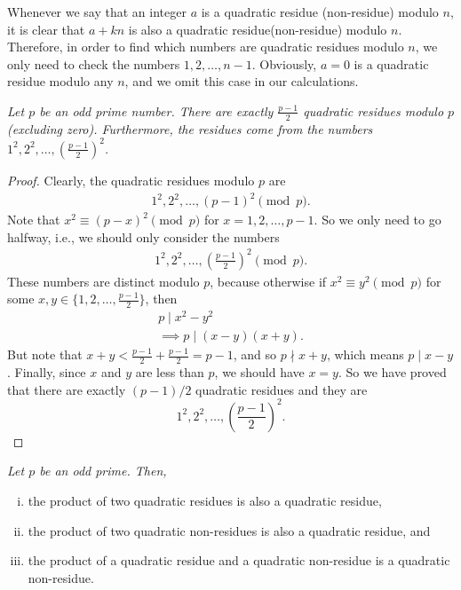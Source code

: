 \documentclass[main.tex]{subfile}
\begin{document}
	\begin{note}
		Whenever we say that an integer $a$ is a quadratic residue (non-residue) modulo $n$, it is clear that $a+kn$ is also a quadratic residue(non-residue) modulo $n$. Therefore, in order to find which numbers are quadratic residues modulo $n$, we only need to check the numbers $1, 2, \ldots, n-1$. Obviously, $a=0$ is a quadratic residue modulo any $n$, and we omit this case in our calculations.
	\end{note}

	\begin{theorem}\slshape\label{thm:primeresidue}
		Let $p$ be an odd prime number. There are exactly $\displaystyle \frac{p-1}{2}$ quadratic residues modulo $p$ (excluding zero). Furthermore, the residues come from the numbers $1^2, 2^2, \ldots, \displaystyle \left(\frac{p-1}{2}\right)^2$.
	\end{theorem}

	\begin{proof}
		Clearly, the quadratic residues modulo $p$ are
		\begin{align*}
			1^2, 2^2, \ldots, (p-1)^2 \pmod p.
		\end{align*}
		Note that $x^2 \equiv (p-x)^2 \pmod p$ for $x=1,2,\ldots,p-1$. So we only need to go halfway, i.e., we should only consider the numbers
		\begin{align*}
			1^2, 2^2, \ldots, \displaystyle \left(\frac{p-1}{2}\right)^2 \pmod p.
		\end{align*}
		These numbers are distinct modulo $p$, because otherwise if $x^2 \equiv y^2 \pmod p$ for some $x,y \in \{1,2,\ldots,\frac{p-1}{2}\}$, then
		\begin{align*}
			p\mid x^2 -y^2\\
			\implies p\mid (x-y)(x+y).
		\end{align*}
		But note that $x+y< \frac{p-1}{2}+\frac{p-1}{2}=p-1$, and so $p \nmid x+y$, which means $p\mid x-y$. Finally, since $x$ and $y$ are less than $p$, we should have $x=y$.
		So we have proved that there are exactly $(p-1)/2$ quadratic residues and they are
		\begin{equation*}
			1^2, 2^2, \ldots, \displaystyle \left(\frac{p-1}{2}\right)^2.
		\end{equation*}
	\end{proof}

	\begin{theorem}\slshape\label{thm:qrnr}
		Let $p$ be an odd prime. Then,
		\begin{enumerate}[(i)]
			\item the product of two quadratic residues is also a quadratic residue,
			\item the product of two quadratic non-residues is also a quadratic residue, and
			\item the product of a quadratic residue and a quadratic non-residue is a quadratic non-residue.
		\end{enumerate}
	\end{theorem}
\end{document}
